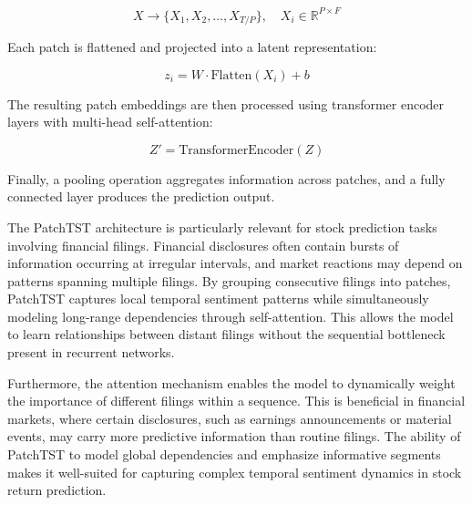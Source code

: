 \begin{equation}
X \rightarrow \{X_1, X_2, \ldots, X_{T/P}\}, \quad X_i \in \mathbb{R}^{P \times F}
\end{equation}

Each patch is flattened and projected into a latent representation:

\begin{equation}
z_i = W \cdot \text{Flatten}(X_i) + b
\end{equation}

The resulting patch embeddings are then processed using transformer encoder layers with multi-head self-attention:

\begin{equation}
Z' = \text{TransformerEncoder}(Z)
\end{equation}

Finally, a pooling operation aggregates information across patches, and a fully connected layer produces the prediction output.

The PatchTST architecture is particularly relevant for stock prediction tasks involving financial filings. Financial disclosures often contain bursts of information occurring at irregular intervals, and market reactions may depend on patterns spanning multiple filings. By grouping consecutive filings into patches, PatchTST captures local temporal sentiment patterns while simultaneously modeling long-range dependencies through self-attention. This allows the model to learn relationships between distant filings without the sequential bottleneck present in recurrent networks.

Furthermore, the attention mechanism enables the model to dynamically weight the importance of different filings within a sequence. This is beneficial in financial markets, where certain disclosures, such as earnings announcements or material events, may carry more predictive information than routine filings. The ability of PatchTST to model global dependencies and emphasize informative segments makes it well-suited for capturing complex temporal sentiment dynamics in stock return prediction.